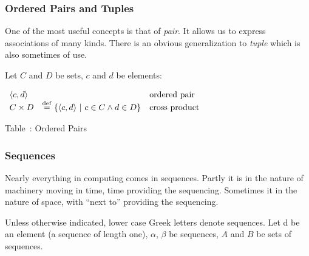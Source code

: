 \subsubsection{Ordered Pairs and Tuples}

One of the most useful concepts is that of {\em pair}.  
It allows us to express associations of many kinds.  
There is an obvious generalization to {\em tuple\/} which is also 
sometimes of use.

\setcounter{PairDefinitions}{\value{table}}

\vspace{0.2in}

\noindent Let $C$ and $D$ be sets, $c$ and $d$ be elements:

\begin{center}
$
\begin{array}{lll}

\langle c, d\rangle		&& \mbox{ordered pair}			\\

C \times D &\eqldef \{\langle c,d\rangle\ |\ c \in C \wedge d \in D\}
			& \mbox{cross product}
\end{array}
$
\end{center}

\begin{center}
Table~\thetable: Ordered Pairs
\end{center}

\subsubsection{Sequences}

Nearly everything in computing comes in sequences.  
Partly it is in the nature of machinery moving in time, 
time providing the sequencing.  Sometimes it in the nature of space,
with ``next to'' providing the sequencing.

\setcounter{SequenceDefinitions}{\value{table}}

Unless otherwise indicated, lower case Greek letters denote sequences.  
Let d be an element (a sequence of length one), $\alpha$, $\beta$ be 
sequences, $A$ and $B$ be sets of sequences.


